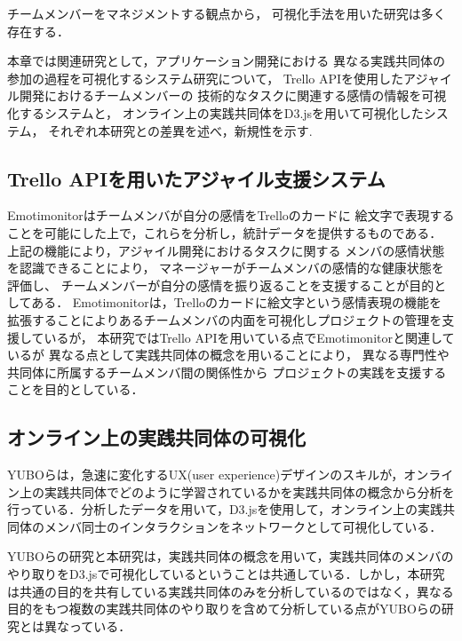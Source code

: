 

チームメンバーをマネジメントする観点から，
可視化手法を用いた研究は多く存在する．

本章では関連研究として，アプリケーション開発における
異なる実践共同体の参加の過程を可視化するシステム研究について，
Trello APIを使用したアジャイル開発におけるチームメンバーの
技術的なタスクに関連する感情の情報を可視化するシステムと，
オンライン上の実践共同体をD3.jsを用いて可視化したシステム，
それぞれ本研究との差異を述べ，新規性を示す.

\subsection{Trello APIを用いたアジャイル支援システム}
Emotimonitorはチームメンバが自分の感情をTrelloのカードに
絵文字で表現することを可能にした上で，これらを分析し，統計データを提供するものである．
上記の機能により，アジャイル開発におけるタスクに関する
メンバの感情状態を認識できることにより，
マネージャーがチームメンバの感情的な健康状態を評価し、
チームメンバーが自分の感情を振り返ることを支援することが目的としてある．
Emotimonitorは，Trelloのカードに絵文字という感情表現の機能を
拡張することによりあるチームメンバの内面を可視化しプロジェクトの管理を支援しているが，
本研究ではTrello APIを用いている点でEmotimonitorと関連しているが
異なる点として実践共同体の概念を用いることにより，
異なる専門性や共同体に所属するチームメンバ間の関係性から
プロジェクトの実践を支援することを目的としている．　　　

\subsection{オンライン上の実践共同体の可視化}
YUBOらは，急速に変化するUX(user experience)デザインのスキルが，オンライン上の実践共同体でどのように学習されているかを実践共同体の概念から分析を行っている．分析したデータを用いて，D3.jsを使用して，オンライン上の実践共同体のメンバ同士のインタラクションをネットワークとして可視化している．

YUBOらの研究と本研究は，実践共同体の概念を用いて，実践共同体のメンバのやり取りをD3.jsで可視化しているということは共通している．しかし，本研究は共通の目的を共有している実践共同体のみを分析しているのではなく，異なる目的をもつ複数の実践共同体のやり取りを含めて分析している点がYUBOらの研究とは異なっている．